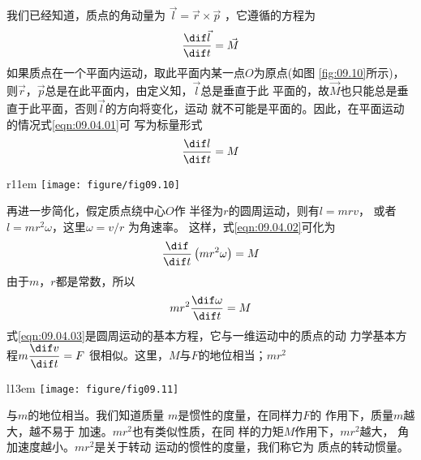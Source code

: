 \documentclass[../outline-of-mechanics.tex]{subfiles}
\begin{document}
\section[转动惯量]{}\label{sec:09.04}

我们已经知道，质点的角动量为 $ \vec{ l } = \vec{ r } \times \vec{ p }$ ，它遵循的方程为
\begin{equation}\label{eqn:09.04.01}
  \frac { \dif \vec{l} } { \dif t } = \vec{M}
\end{equation}
如果质点在一个平面内运动，取此平面内某一点$ O $为原点(如图
\ref{fig:09.10}所示)，则$ \vec{ r } $，$ \vec{ p } $总是在此平面内，由定义知，$ \vec{l} $总是垂直于此
平面的，故$ \vec{M} $也只能总是垂直于此平面，否则$ \vec{l} $的方向将变化，运动
\clearpage\noindent
就不可能是平面的。因此，在平面运动的情况\lhbrak 式\eqref{eqn:09.04.01}\rhbrak 可
写为标量形式
\begin{equation}\label{eqn:09.04.02}
  \frac { \dif l } { \dif t } = M
\end{equation}
\begin{wrapfigure}[6]{r}{11em}
  \centering
  \texttt{[image: figure/fig09.10]}
  \caption{平面运动中的$ r $及$ p $}
  \label{fig:09.10}
\end{wrapfigure}
再进一步简化，假定质点绕中心$ O $作
半径为$ r $的圆周运动，则有$ l = m r v $，
或者$ l = m r ^ { 2 } \omega $，这里$ \omega = v / r $ 为角速率。
这样，式\eqref{eqn:09.04.02}可化为
\begin{equation*}
  \frac { \dif } { \dif t } \left( m r ^ { 2 } \omega \right) = M
\end{equation*}
由于$ m $，$ r $都是常数，所以
\begin{equation}\label{eqn:09.04.03}
  m r ^ { 2 } \frac { \dif \omega } { \dif t } = M
\end{equation}
式\eqref{eqn:09.04.03}是圆周运动的基本方程，它与一维运动中的质点的动
力学基本方程$ m \dfrac { \dif v } { \dif t } = F $ 很相似。这里，$ M $与$ F $的地位相当；$ m r ^ 2 $

\begin{wrapfigure}[9]{l}{13em}
  \centering
  \texttt{[image: figure/fig09.11]}
  \caption{两质点的圆周运动}
  \label{fig:09.11}
\end{wrapfigure}
\noindent 与$ m $的地位相当。我们知道质量
$ m $是惯性的度量，在同样力$ F $的
作用下，质量$ m $越大，越不易于
加速。$ mr^2 $也有类似性质，在同
样的力矩$ M $作用下，$ mr^2 $越大，
角加速度越小。$ mr^2 $是关于转动
运动的惯性的度量，我们称它为
质点的转动惯量。
\end{document}
